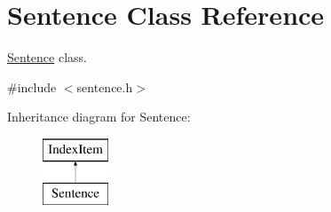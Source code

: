 \hypertarget{class_sentence}{}\section{Sentence Class Reference}
\label{class_sentence}


\hyperlink{class_sentence}{Sentence} class.  




{\ttfamily \#include $<$sentence.\+h$>$}

Inheritance diagram for Sentence\+:\begin{figure}[H]
\begin{center}
\leavevmode
\includegraphics[height=2.000000cm]{class_sentence}
\end{center}
\end{figure}
